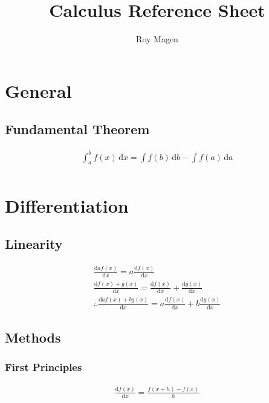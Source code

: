 \documentclass[12pt]{article}
\title{Calculus Reference Sheet}
\author{Roy Magen}
\date{ }
\begin{document}
	\newcommand{\differ}{\text{d}}

	\newcommand{\derivative}[2][x]{\frac{\differ #2}{\differ #1}}
	\newcommand{\integral}[2][x]{\int #2\,\differ #1}
	\newcommand{\arccsc}[0]{\,\text{arccsc}\,}
	\newcommand{\arcsec}[0]{\,\text{arcsec}\,}
	\newcommand{\arccot}[0]{\,\text{arccot}\,}

	\begin{titlepage}
	\maketitle
	\end{titlepage}
	
	\tableofcontents
	\pagebreak

	\section{General}
		\subsection{Fundamental Theorem}
			\begin{gather}
				\integral{_a^b f(x)} = \integral[b]{f(b)} - \integral[a]{f(a)} \\
			\end{gather}
	\section{Differentiation}
		\subsection{Linearity}
			\begin{gather}
				\derivative{af(x)} = a\derivative{f(x)} \\
				\derivative{f(x) + g(x)} = \derivative{f(x)} +
				\derivative{g(x)} \\
				\therefore \derivative{af(x) + bg(x)} = a\derivative{f(x)}
				+ b\derivative{g(x)}
			\end{gather}
		\subsection{Methods}
			\subsubsection{First Principles}
				\begin{gather}
					\derivative{f(x)} = \frac{f(x + h) -
					f(x)}{h}
				\end{gather}
\end{document}
